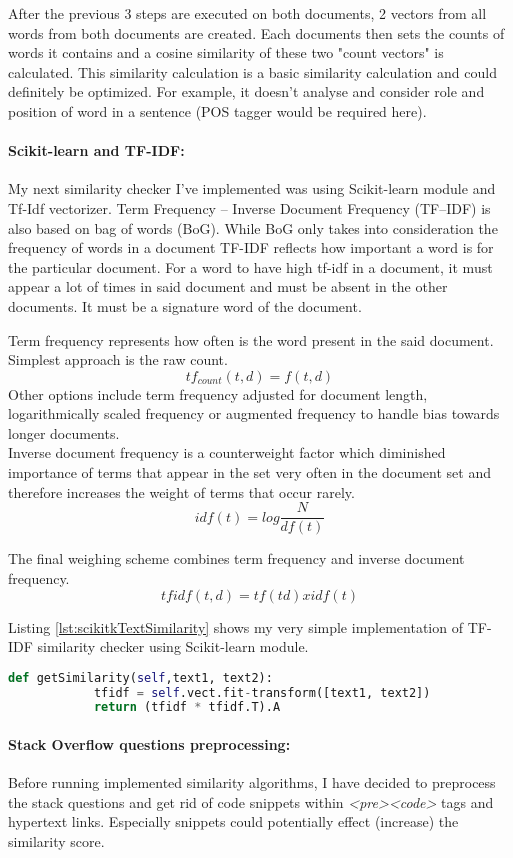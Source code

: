 After the previous 3 steps are executed on both documents, 2 vectors from all words from both documents are created. Each documents then sets the counts of words it contains and a cosine similarity of these two "count vectors" is calculated. This similarity calculation is a basic similarity calculation and could definitely be optimized. For example, it doesn't analyse and consider role and position of word in a sentence (POS tagger would be required here). 

\paragraph{Scikit-learn and TF-IDF:}My next similarity checker I've implemented was using Scikit-learn module and Tf-Idf vectorizer. Term Frequency – Inverse Document Frequency (TF–IDF) is also based on bag of words (BoG). While BoG only takes into consideration the frequency of words in a document TF-IDF reflects how important a word is for the particular document. For a word to have high tf-idf in a document, it must appear a lot of times in said document and must be absent in the other documents. It must be a signature word of the document.

Term frequency represents how often is the word present in the said document. Simplest approach is the raw count.
\[ tf_{count}(t,d) = f(t,d) \]
Other options include term frequency adjusted for document length, logarithmically scaled frequency or augmented frequency to handle bias towards longer documents.\\
Inverse document frequency is a counterweight factor which 
diminished importance of terms that appear in the set very often in the document set and therefore increases the weight of terms that occur rarely.
\[ idf(t) = log \frac{N}{df(t)} \]

The final weighing scheme combines term frequency and inverse document frequency.
\[ tfidf(t,d) = tf(td) x idf(t)		\]

Listing \ref{lst:scikitkTextSimilarity} shows my very simple implementation of TF-IDF similarity checker using Scikit-learn module.

\begin{lstlisting}[caption={Text similarity implementation with Scikit using Tf-Idf model},label={lst:scikitkTextSimilarity},language=Python]
		def getSimilarity(self,text1, text2):
			tfidf = self.vect.fit-transform([text1, text2])
			return (tfidf * tfidf.T).A
\end{lstlisting}

\paragraph{Stack Overflow questions preprocessing:} Before running implemented similarity algorithms, I have decided to preprocess the stack questions and get rid of code snippets within \textit{\textless pre\textgreater\textless code\textgreater} tags and hypertext links. Especially snippets could potentially effect (increase) the similarity score.

	